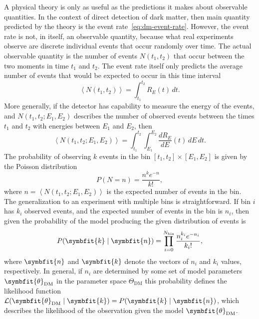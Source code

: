 \documentclass[b5paper, 10pt, twoside]{book}
\renewcommand{\vec}[1]{\symbfit{#1}}
\newcommand{\der}[2]{\frac{d#1}{d#2}}
\newcommand{\difd}{\,d}
\newcommand{\mean}[1]{\left\langle#1\right\rangle}
\begin{document}
A physical theory is only as useful as the predictions it makes about observable quantities. In the context of direct detection of dark matter, then main quantity predicted by the theory is the event rate~\eqref{eq:dm-event-rate}. However, the event rate is not, in itself, an observable quantity, because what real experiments observe are discrete individual events that occur randomly over time. The actual observable quantity is the number of events $N(t_1,t_2)$ that occur between the two moments in time $t_1$ and $t_2$. The event rate itself only predicts the average number of events that would be expected to occur in this time interval
\begin{equation}
\mean{N(t_1,t_2)}=\int_{t_1}^{t_2}R_E(t)\difd t.
\end{equation}
More generally, if the detector has capability to measure the energy of the events, and $N(t_1,t_2;E_1,E_2)$ describes the number of observed events between the times $t_1$ and $t_2$ with energies between $E_1$ and $E_2$, then
\begin{equation}
\mean{N(t_1,t_2;E_1,E_2)}=\int_{t_1}^{t_2}\int_{E_1}^{E_2}\der{R_E}{E}(t)\difd E\difd t.
\end{equation}
The probability of observing $k$ events in the bin $[t_1,t_2]\times[E_1,E_2]$ is given by the Poisson distribution
\begin{equation}
P(N=n)=\frac{n^ke^{-n}}{k!},
\end{equation}
where $n=\mean{N(t_1,t_2;E_1,E_2)}$ is the expected number of events in the bin. The generalization to an experiment with multiple bins is straightforward. If bin $i$ has $k_i$ observed events, and the expected number of events in the bin is $n_i$, then given the probability of the model producing the given distribution of events is
\begin{equation}
P(\vec{k}\mid \vec{n})=\prod_{i=0}^{N_\text{bin}}\frac{n_i^{k_i}e^{-n_i}}{{k_i}!},
\end{equation}
where $\vec{n}$ and $\vec{k}$ denote the vectors of $n_i$ and $k_i$ values, respectively. In general, if $n_i$ are determined by some set of model parameters $\vec{\theta}_\text{DM}$ in the parameter space $\Theta_\text{DM}$ this probability defines the likelihood function $\mathcal{L}(\vec{\theta}_\text{DM}\mid\vec{k})=P(\vec{k}\mid \vec{n})$, which describes the likelihood of the observation given the model $\vec{\theta}_\text{DM}$.
\end{document}
